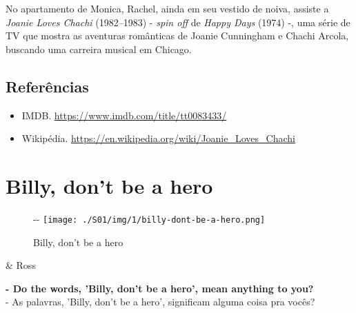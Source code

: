 No apartamento de Monica, Rachel, ainda em seu vestido de noiva, assiste
a \emph{Joanie Loves Chachi} (1982--1983) - \emph{spin off} de
\emph{Happy Days} (1974) -, uma série de TV que mostra as aventuras
românticas de Joanie Cunningham e Chachi Arcola, buscando uma carreira
musical em Chicago.

\hypertarget{referuxeancias-5}{%
\subsection{Referências}\label{referuxeancias-5}}

\begin{itemize}
\tightlist
\item
  \sloppy IMDB. \url{https://www.imdb.com/title/tt0083433/}
\item
  \sloppy Wikipédia. \url{https://en.wikipedia.org/wiki/Joanie_Loves_Chachi}
\end{itemize}

\hypertarget{billy-dont-be-a-hero}{%
\section{Billy, don't be a hero}\label{billy-dont-be-a-hero}}

\begin{figure}[!ht]
  \begin{adjustwidth}{-\oddsidemargin-1in}{-\rightmargin}
    \centering
    \texttt{[image: ./S01/img/1/billy-dont-be-a-hero.png]}
    \caption{Billy, don’t be a hero\label{fig:billy-don-t-be-a-hero}}
  \end{adjustwidth}
\end{figure}

\begin{tcolorbox}[enhanced,center upper,
    drop fuzzy shadow southeast, boxrule=0.3pt,
    lower separated=false,
    colframe=black!30!dialogoBorder,colback=white]
\begin{minipage}[c]{0.14\linewidth}
   & \centering \scriptsize{Ross}
\end{minipage}
\hspace{.1mm}
\begin{minipage}[c]{0.8\linewidth}
  \textbf{- Do the words, 'Billy, don't be a hero', mean anything to you?}\\
  - As palavras, 'Billy, don't be a hero', significam alguma coisa pra vocês?
\end{minipage}
\end{tcolorbox}

